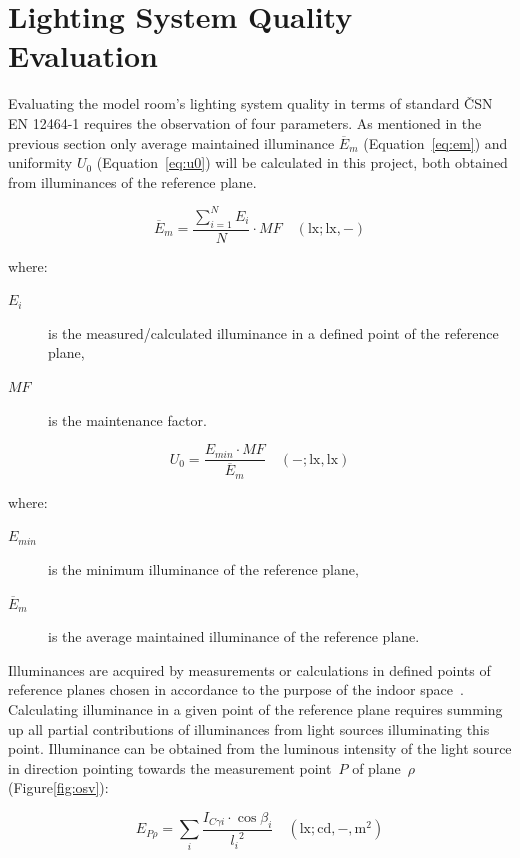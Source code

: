 \section{Lighting System Quality Evaluation}
Evaluating the model room's lighting system quality in terms of standard \v{C}SN EN 12464-1\cite{12464} requires the observation of four parameters. As mentioned in the previous section only average maintained illuminance $\overline{E}_{m}$ (Equation~\ref{eq:em}) and uniformity $U_{0}$ (Equation~\ref{eq:u0}) will be calculated in this project, both obtained from illuminances of the reference plane.

\begin{equation}
\overline{E}_{m}=\frac{\sum_{i=1}^N E_{i}}{N} \cdot MF \quad \mathrm{(lx;lx,-)}
\label{eq:em}
\end{equation}

\noindent where:
\begin{description}
	\item[$E_{i}$] is the measured/calculated illuminance in a defined point of the reference plane,
	\item[$MF$] is the maintenance factor.
\end{description}

\begin{equation}
U_{0}=\frac{E_{min}\cdot MF}{\overline{E}_{m}} \quad \mathrm{(-;lx,lx)}
\label{eq:u0}
\end{equation}

\noindent where:
\begin{description}
	\item[$E_{min}$] is the minimum illuminance of the reference plane,
	\item[$\overline{E}_{m}$] is the average maintained illuminance of the reference plane.
\end{description}

Illuminances are acquired by measurements or calculations in defined points of reference planes chosen in accordance to the purpose of the indoor space~\cite{12464}. Calculating illuminance in a given point of the reference plane requires summing up all partial contributions of illuminances from light sources illuminating this point. Illuminance can be obtained from the luminous intensity of the light source in direction pointing towards the measurement point~$P$ of plane~$\rho$ (Figure\ref{fig:osv}):

\begin{equation}
E_{P\rho}=\sum_{i} \frac{I_{C \gamma i} \cdot \cos{\beta_{i}}}{{l_{i}}^{2}} \quad \mathrm{(lx;cd,-,m^{2})}
\label{eq:illSum}
\end{equation}

